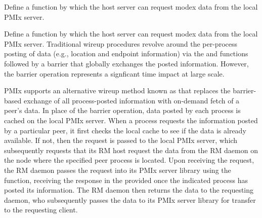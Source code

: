 \summary

Define a function by which the host server can request modex data from the local PMIx server.

\format


\begin{arglist}
\end{arglist}

\returnsimplenb

\descr

Define a function by which the host server can request modex data from the local \ac{PMIx} server. Traditional wireup procedures revolve around the per-process posting of data (e.g., location and endpoint information) via the  and  functions followed by a  barrier that globally exchanges the posted information. However, the barrier operation represents a signficant time impact at large scale.

\ac{PMIx} supports an alternative wireup method known as  that replaces the barrier-based exchange of all process-posted information with on-demand fetch of a peer's data. In place of the barrier operation, data posted by each process is cached on the local \ac{PMIx} server. When a process requests the information posted by a particular peer, it first checks the local cache to see if the data is already available. If not, then the request is passed to the local \ac{PMIx} server, which subsequently requests that its \ac{RM} host request the data from the \ac{RM} daemon on the node where the specified peer process is located. Upon receiving the request, the \ac{RM} daemon passes the request into its \ac{PMIx} server library using the  function, receiving the response in the provided  once the indicated process has posted its information. The \ac{RM} daemon then returns the data to the requesting daemon, who subsequently passes the data to its \ac{PMIx} server library for transfer to the requesting client.


